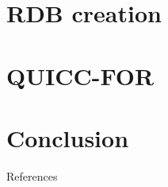 \documentclass{eecslides}
\begin{document}
\section{RDB creation}

\section{QUICC-FOR}

\section{Conclusion}


\nocite{Poisot2013a}

\begin{frame}[allowsframebreaks]{References}
	
		
\end{frame}
\end{document}
